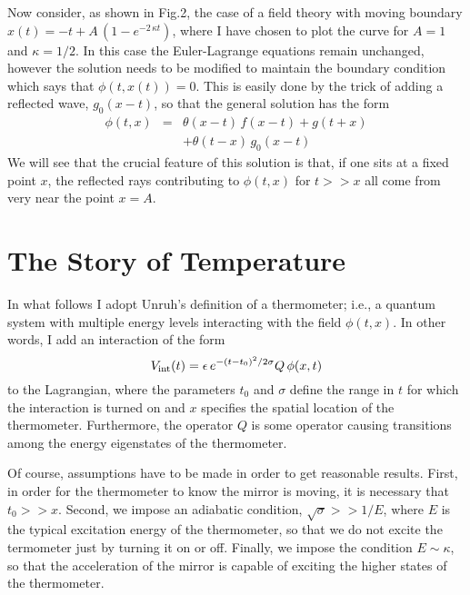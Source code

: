 \documentclass[12pt]{article}
\begin{document}
Now consider, as shown in Fig.2, the case of a field theory with moving
boundary $x(t) = -t + A\,(1-e^{-2\,\kappa t})$, where I have chosen to plot
the curve for $A=1$ and $\kappa=1/2$.  In this case the Euler-Lagrange equations
remain unchanged, however the solution needs to be modified to maintain the
boundary condition which says that $\phi(t,x(t)) = 0$.
This is easily done by the trick of adding a reflected
wave, $g_0(x-t)$, so that the general solution has the form
\begin{eqnarray}
\phi(t,x) &=& \theta(x-t)\,f(x-t) + g(t+x) \nonumber \\
& &+ \theta(t-x)\,g_0(x-t)
\end{eqnarray}
We will see that the crucial feature of this solution is that, if one sits at a fixed
point $x$, the reflected rays contributing to $\phi(t,x)$ for $t >> x$
all come from very near the point $x = A$.

\epsfverbosetrue
\begin{figure}
\begin{center}
\leavevmode
\vskip 2in
\end{center}
\vskip -2in
\caption[movingmirror]{}
\label{movingmirror}
\end{figure}

\section{The Story of Temperature}

In what follows I adopt Unruh's definition of a thermometer; i.e., a
quantum system with multiple energy levels interacting with
the field $\phi(t,x)$.  In other words,
I add an interaction of the form 
\begin{equation}
V_{\rm int}(t) = \epsilon\,e^{-(t-t_0)^2/2\sigma} Q\,\phi(x,t)    
\end{equation}
to the Lagrangian,
where the parameters $t_0$ and $\sigma$ define the range in $t$ for which
the interaction is turned on and $x$ specifies the spatial location of the thermometer.
Furthermore, the operator $Q$ is some operator causing transitions among the
energy eigenstates of the thermometer.

Of course, assumptions have to be made in order to get reasonable results.
First, in order for the thermometer to know the mirror is moving, it is
necessary that $t_0 >> x$.  Second, we impose an adiabatic condition,
$\sqrt{\sigma} >> 1/E$, where $E$
is the typical excitation energy of the thermometer, so that we do not excite
the termometer just by turning it on or off.  Finally, we impose the condition
$ E \sim \kappa $, so that the
acceleration of the mirror is capable of exciting the higher states of the thermometer.
\end{document}
